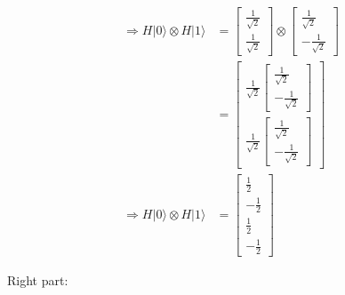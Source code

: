 \documentclass{article}
\begin{document}
\begin{equation}
\begin{split}
    \Longrightarrow H|0\rangle \otimes H|1\rangle & = \begin{bmatrix}
        \frac{1}{\sqrt{2}} \\
        \frac{1}{\sqrt{2}}
    \end{bmatrix} \otimes \begin{bmatrix}
        \frac{1}{\sqrt{2}} \\
        -\frac{1}{\sqrt{2}}
    \end{bmatrix} \\
    & = \begin{bmatrix}
        \frac{1}{\sqrt{2}} \begin{bmatrix}
            \frac{1}{\sqrt{2}} \\
            -\frac{1}{\sqrt{2}}
        \end{bmatrix} \\
        \frac{1}{\sqrt{2}} \begin{bmatrix}
            \frac{1}{\sqrt{2}} \\
            -\frac{1}{\sqrt{2}}
        \end{bmatrix}
    \end{bmatrix} \\
    \Longrightarrow H|0\rangle \otimes H|1\rangle & = \begin{bmatrix}
        \frac{1}{2} \\
        -\frac{1}{2} \\
        \frac{1}{2} \\
        -\frac{1}{2}
    \end{bmatrix}
\end{split}
\end{equation}

Right part:
\end{document}
